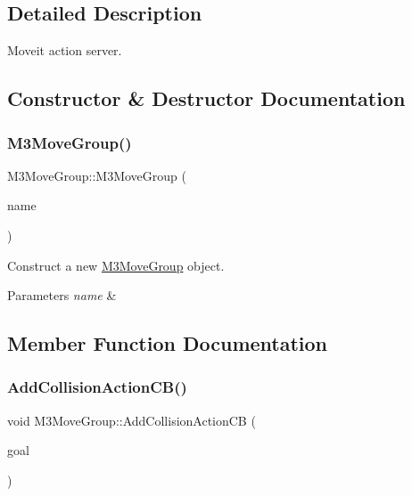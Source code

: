 \subsection{Detailed Description}
Moveit action server. 

\subsection{Constructor \& Destructor Documentation}
\mbox{\label{classM3MoveGroup_aeb66c992c2a648e53f823a6058669c4c}} 
\subsubsection{\texorpdfstring{M3\+Move\+Group()}{M3MoveGroup()}}
{\footnotesize\ttfamily M3\+Move\+Group\+::\+M3\+Move\+Group (\begin{DoxyParamCaption}\item[{std\+::string}]{name }\end{DoxyParamCaption})\hspace{0.3cm}{\ttfamily [inline]}}



Construct a new \hyperlink{classM3MoveGroup}{M3\+Move\+Group} object. 


\begin{DoxyParams}{Parameters}
{\em name} & \\
\hline
\end{DoxyParams}


\subsection{Member Function Documentation}
\mbox{\label{classM3MoveGroup_aa1aa80c1a53d3829ed0e535f728cbe63}} 
\subsubsection{\texorpdfstring{Add\+Collision\+Action\+C\+B()}{AddCollisionActionCB()}\hspace{0.1cm}{\footnotesize\ttfamily [1/2]}}
{\footnotesize\ttfamily void M3\+Move\+Group\+::\+Add\+Collision\+Action\+CB (\begin{DoxyParamCaption}\item[{const m3\+\_\+moveit\+::\+Moveit\+Collide\+Goal\+Const\+Ptr \&}]{goal }\end{DoxyParamCaption})\hspace{0.3cm}{\ttfamily [inline]}}



